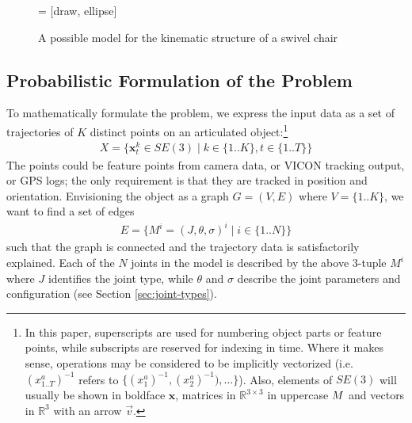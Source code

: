\documentclass[letterpaper, 10 pt, conference]{ieeeconf}  %
\def\xmat{\uppercase}    \def\xmatstr{in uppercase}
\def\xvec{\vec}          \def\xvecstr{with an arrow}
\def\xse{\bm}            \def\xsestr{in boldface}
\begin{document}
        \begin{figure}[ht]
          \centering
           = [draw, ellipse]
          \caption{A possible model for the kinematic structure of a swivel chair}
          \label{fig:Sswivel}
        \end{figure}

\subsection{Probabilistic Formulation of the Problem}
To mathematically formulate the problem, we express the input data as a set of trajectories of $K$ distinct points on an articulated object:\footnote{In this paper, superscripts are used for numbering object parts or feature points, while subscripts are reserved for indexing in time. Where it makes sense, operations may be considered to be implicitly vectorized (i.e. $(x_{1..T}^a)^{-1}$ refers to $\{(x_1^a)^{-1}, (x_2^a)^{-1}), \dots\}$). Also, elements of $SE(3)$ will usually be shown \xsestr{} $\xse{x}$, matrices in $\mathbb{R}^{3 \times 3}$ \xmatstr{} $\xmat{m}$ and vectors in $\mathbb{R}^3$ \xvecstr{} $\xvec{v}$.}
\begin{align}
  X = \{ \xse{x}_t^k \in SE(3) \mid k \in \{1..K\}, t \in \{1..T\} \}
\end{align}
The points could be feature points from camera data, or VICON tracking output, or GPS logs; the only requirement is that they are tracked in position and orientation. Envisioning the object as a graph $G = (V,E)$ where $V = \{1..K\}$, we want to find a set of edges
\begin{align}
  E = \{M^i = (J,\theta,\sigma)^i \mid i \in \{1..N\}\} \label{eqn:m-tuple}
\end{align}
such that the graph is connected and the trajectory data is satisfactorily explained. Each of the $N$ joints in the model is described by the above 3-tuple $M^i$ where $J$ identifies the joint type, while $\theta$ and $\sigma$ describe the joint parameters and configuration (see Section \ref{sec:joint-types}).
\end{document}
